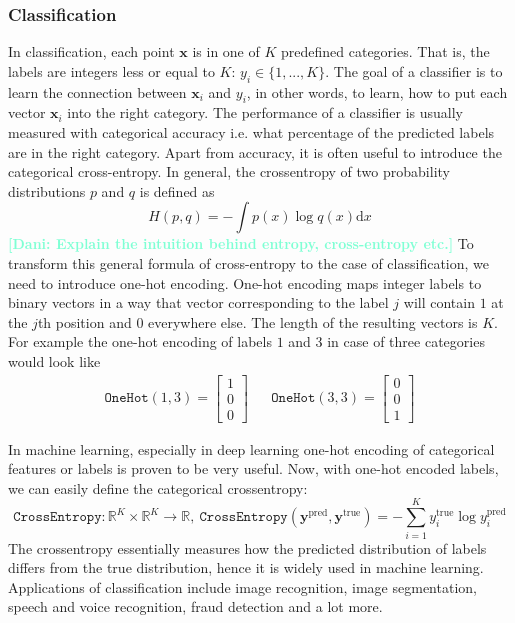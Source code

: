 \documentclass[12pt, a4paper,  nobibnotes]{article}
\newcommand{\dd}{\mathrm{d}}
\newcommand{\nd}[1]{\textcolor{Aquamarine}{\textbf{[Dani: #1]}}}
\begin{document}
\subsubsection{Classification}
In classification, each point $\mathbf x$ is in one of $K$ predefined categories. That is, 
the labels are integers less or equal to $K$: $y_i \in \{1, ..., K\}$. The goal of a classifier 
is to learn the connection between $\mathbf x_i$ and $y_i$, in other words, to learn, how to 
put each vector $\mathbf x_i$ into the right category. The performance of a classifier is usually measured
with categorical accuracy i.e. what percentage of the predicted labels are in the right category.
Apart from accuracy, it is often useful to introduce the categorical cross-entropy. In general, the 
crossentropy of two probability distributions $p$ and $q$ is defined as 
\begin{equation}
    H(p,q) = -\int p(x)\log q(x)\dd x
\end{equation}
\nd{Explain the intuition behind entropy, cross-entropy etc.}
To transform this general formula of cross-entropy to the case of classification, we need to introduce
one-hot encoding. One-hot encoding maps integer labels to binary vectors in a way that vector 
corresponding to the label $j$ will contain $1$ at the $j$th position and $0$ everywhere else. The
length of the resulting vectors is $K$. For example the one-hot encoding of labels $1$ and $3$ in case of 
three categories would look like
\begin{align}
    \texttt{OneHot}(1,3) = \begin{bmatrix}
        1\\0\\0
    \end{bmatrix}
    &&\texttt{OneHot}(3,3) = \begin{bmatrix}
        0\\0\\1
    \end{bmatrix}
\end{align}

In machine learning, especially in deep learning one-hot encoding of categorical features or labels
is proven to be very useful. Now, with one-hot encoded labels, we can easily define the categorical
crossentropy:
\begin{equation}
    \texttt{CrossEntropy}: \mathbb R^K\times \mathbb R^K \rightarrow \mathbb R,~
    \texttt{CrossEntropy}(\mathbf y^{\textrm{pred}}, \mathbf y^{\textrm{true}})
    = -\sum\limits_{i=1}^K y_i^{\textrm{true}} \log y_i^{\textrm{pred}}
    \label{eq:crossentropy}
\end{equation}
The crossentropy essentially measures how the predicted distribution of labels differs from the 
true distribution, hence it is widely used in machine learning.
Applications of classification include image recognition, image segmentation, speech and voice recognition,
fraud detection and a lot more. 
\end{document}
